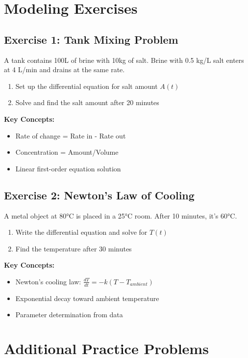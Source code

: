 \documentclass[12pt, letterpaper]{book}
\begin{document}
\section{Modeling Exercises}

\subsection{Exercise 1: Tank Mixing Problem}
A tank contains 100L of brine with 10kg of salt. Brine with 0.5 kg/L salt enters at 4 L/min and drains at the same rate.
\begin{enumerate}
    \item Set up the differential equation for salt amount $A(t)$
    \item Solve and find the salt amount after 20 minutes
\end{enumerate}

\textbf{Key Concepts:}
\begin{itemize}
    \item Rate of change = Rate in - Rate out
    \item Concentration = Amount/Volume
    \item Linear first-order equation solution
\end{itemize}

\subsection{Exercise 2: Newton's Law of Cooling}
A metal object at 80°C is placed in a 25°C room. After 10 minutes, it's 60°C.
\begin{enumerate}
    \item Write the differential equation and solve for $T(t)$
    \item Find the temperature after 30 minutes
\end{enumerate}

\textbf{Key Concepts:}
\begin{itemize}
    \item Newton's cooling law: $\frac{dT}{dt} = -k(T - T_{ambient})$
    \item Exponential decay toward ambient temperature
    \item Parameter determination from data
\end{itemize}

\section{Additional Practice Problems}
\end{document}
